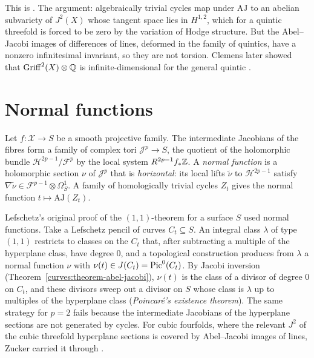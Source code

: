 This is \cite{griffiths-1969}. The argument: algebraically trivial cycles map under $\mathrm{AJ}$ to an abelian subvariety of $J^2(X)$ whose tangent space lies in $H^{1,2}$, which for a quintic
threefold is forced to be zero by the variation of Hodge structure. But the Abel--Jacobi images of differences of lines, deformed in the family of quintics, have a nonzero infinitesimal
invariant, so they are not torsion. Clemens later showed that $\mathrm{Griff}^2(X) \otimes \mathbb{Q}$ is infinite-dimensional for the general quintic \cite{clemens-1983}.

\section{Normal functions}\label{intermediate-jacobians:section-normal-functions}

\begin{definition}\label{intermediate-jacobians:definition-normal-function}
Let $f \colon \mathcal{X} \to S$ be a smooth projective family. The intermediate Jacobians of the fibres form a family of complex tori $\mathcal{J}^p \to S$, the quotient of the holomorphic bundle
$\mathcal{H}^{2p-1}/\mathcal{F}^p$ by the local system $R^{2p-1}f_*\mathbb{Z}$. A \emph{normal function} is a holomorphic section $\nu$ of $\mathcal{J}^p$ that is \emph{horizontal}: its local lifts $\tilde\nu$ to
$\mathcal{H}^{2p-1}$ satisfy $\nabla\tilde\nu \in \mathcal{F}^{p-1} \otimes \Omega^1_S$. A family of homologically trivial cycles $Z_t$ gives the normal function $t \mapsto \mathrm{AJ}(Z_t)$.
\end{definition}

\begin{remark}\label{intermediate-jacobians:remark-poincare-lefschetz}
Lefschetz's original proof of the $(1,1)$-theorem for a surface $S$ used normal functions. Take a Lefschetz pencil of curves $C_t \subseteq S$. An integral class $\lambda$ of type $(1,1)$ restricts to
classes on the $C_t$ that, after subtracting a multiple of the hyperplane class, have degree $0$, and a topological construction produces from $\lambda$ a normal function $\nu$ with
$\nu(t) \in J(C_t) = \operatorname{Pic}^0(C_t)$. By Jacobi inversion (Theorem~\ref{curves:theorem-abel-jacobi}), $\nu(t)$ is the class of a divisor of degree $0$ on $C_t$, and these divisors sweep out a divisor on $S$
whose class is $\lambda$ up to multiples of the hyperplane class (\emph{Poincar\'e's existence theorem}). The same strategy for $p = 2$ fails because the intermediate Jacobians of the
hyperplane sections are not generated by cycles. For cubic fourfolds, where the relevant $J^2$ of the cubic threefold hyperplane sections is covered by Abel--Jacobi images of
lines, Zucker carried it through \cite{zucker-1977}.
\end{remark}

